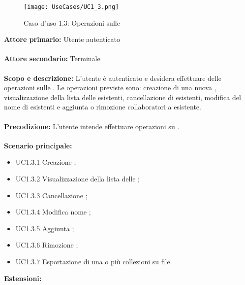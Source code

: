 \documentclass{scalatekids-article}
\begin{document}
\begin{figure}[H]
  \begin{center}
    \texttt{[image: UseCases/UC1\_3.png]}
    \caption*{Caso d'uso 1.3: Operazioni sulle }
  \end{center}
\end{figure}
\textbf{Attore primario:} Utente autenticato\\ \\
\textbf{Attore secondario:} Terminale\\ \\
\textbf{Scopo e descrizione:} L'utente è autenticato e desidera effettuare delle operazioni sulle . Le operazioni previste sono:
creazione di una nuova , visualizzazione della lista delle  esistenti, cancellazione di  esistenti, modifica del nome di  esistenti e
aggiunta o rimozione collaboratori a  esistente.\\ \\
\textbf{Precodizione:} L'utente intende effettuare operazioni su .\\ \\
\textbf{Scenario principale:}
\begin{itemize}
\item UC1.3.1 Creazione ;
\item UC1.3.2 Visualizzazione della lista delle ;
\item UC1.3.3 Cancellazione ;
\item UC1.3.4 Modifica nome ;
\item UC1.3.5 Aggiunta ;
\item UC1.3.6 Rimozione ;
\item UC1.3.7 Esportazione di una o più collezioni su file.
\end{itemize}
\textbf{Estensioni:}
\end{document}
